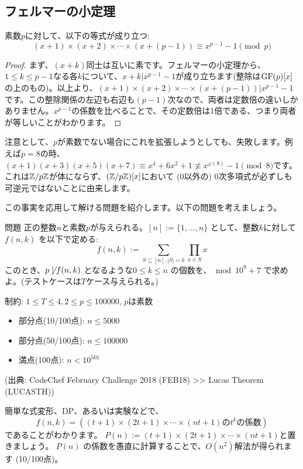 \documentclass{jsarticle}
\begin{document}
  \subsection{フェルマーの小定理}
  \begin{theorem}
   \label{thm:polynomial-fermat}
   素数$p$に対して、以下の等式が成り立つ:
   \begin{displaymath}
    (x+1) \times (x+2) \times \cdots \times (x + (p - 1)) \equiv x^{p-1} - 1 \pmod p
   \end{displaymath}
  \end{theorem}
  \begin{proof}
  まず、$(x+k)$同士は互いに素です。フェルマーの小定理から、$1 \le k \le p - 1$なる各$k$について、$x + k | x^{p-1} - 1$が成り立ちます(整除は$\mathrm{GF}(p)[x]$の上のもの)。以上より、$(x+1) \times (x+2) \times \cdots \times (x + (p - 1)) | x^{p-1}-1$です。この整除関係の左辺も右辺も$(p-1)$次なので、両者は定数倍の違いしかありません。$x^{p-1}$の係数を比べることで、その定数倍は1倍である、つまり両者が等しいことがわかります。
  \end{proof}
  注意として、$p$が素数でない場合にこれを拡張しようとしても、失敗します。例えば$p=8$の時、$(x+1)(x+3)(x+5)(x+7) \equiv x^4 + 6x^2 + 1 \not \equiv x^{\varphi(8)}-1 \pmod 8$です。これは$\mathbb{Z}/p\mathbb{Z}$が体にならず、$(\mathbb{Z}/p\mathbb{Z})[x]$において (0以外の) 0次多項式が必ずしも可逆元ではないことに由来します。

  この事実を応用して解ける問題を紹介します。以下の問題を考えましょう。
  \begin{itembox}[l]{問題}
   正の整数$n$と素数$p$が与えられる。$[n] := \{1,\ldots, n\}$ として、整数$k$に対して$f(n, k)$ を以下で定める:
   \begin{displaymath}
    f(n, k) := \sum_{S \subseteq [n], |S| = k} \prod_{x \in S} x
   \end{displaymath}
   このとき、$p \not \mid f(n, k)$ となるような$0 \le k \le n$ の個数を、${} \bmod 10^9+7$ で求めよ。(テストケースは$T$ケース与えられる。)

   制約: $1 \le T \le 4, 2 \le p \le 100000$, $p$は素数
   \begin{itemize}
    \item 部分点(10/100点): $n \le 5000$
    \item 部分点(50/100点): $n \le 100000$
    \item 満点(100点): $n < 10^{501}$
   \end{itemize}

   (出典: CodeChef February Challenge 2018 (FEB18) >> Lucas Theorem (LUCASTH))
  \end{itembox}
  簡単な式変形、DP、あるいは実験などで、
  \begin{displaymath}
   f(n, k) = ((t + 1) \times (2t + 1) \times \cdots \times (nt + 1) \mbox{の$t^k$の係数})
  \end{displaymath}
  であることがわかります。
  $P(n) := (t + 1) \times (2t + 1) \times \cdots \times (nt + 1)$と置きましょう。
  $P(n)$ の係数を愚直に計算することで、$O(n^2)$解法が得られます (10/100点)。
\end{document}
